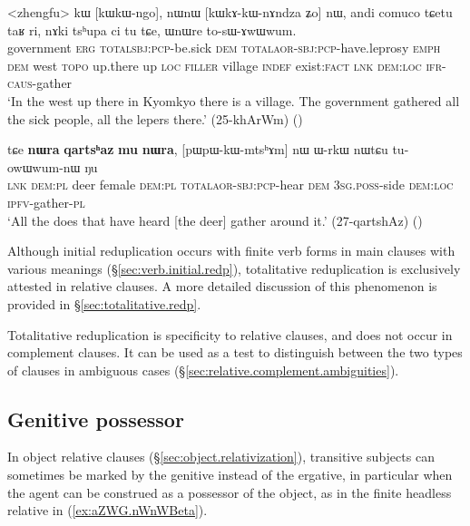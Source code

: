\begin{exe}
\ex \label{ex:kWkWngo.kWkAkWnAndza}
\gll <zhengfu> kɯ [kɯ\redp{}kɯ-ngo], nɯnɯ [kɯ\redp{}kɤ-kɯ-nɤndza ʑo] nɯ, andi comuco tɕetu taʁ ri, nɤki tsʰupa ci tu tɕe, ɯnɯre to-sɯ-ɤwɯwum. \\
government \textsc{erg} \textsc{total}\redp{}\textsc{sbj}:\textsc{pcp}-be.sick \textsc{dem} \textsc{total}\redp{}\textsc{aor}-\textsc{sbj}:\textsc{pcp}-have.leprosy \textsc{emph} \textsc{dem} west  \textsc{topo} up.there up \textsc{loc} \textsc{filler} village \textsc{indef} exist:\textsc{fact} \textsc{lnk} \textsc{dem}:\textsc{loc} \textsc{ifr}-\textsc{caus}-gather \\
\glt `In the west up there in Kyomkyo there is a village. The government gathered all the sick people, all the lepers there.' (25-khArWm)
()
\end{exe}

\begin{exe}
\ex \label{ex:qartshaz.pWpWkWmtshAm}
\gll  tɕe \textbf{nɯra} \textbf{qartsʰaz} \textbf{mu} \textbf{nɯra},  [pɯ\redp{}pɯ-kɯ-mtsʰɤm] nɯ ɯ-rkɯ nɯtɕu tu-owɯwum-nɯ ŋu \\
\textsc{lnk} \textsc{dem}:\textsc{pl} deer female \textsc{dem}:\textsc{pl} \textsc{total}\redp{}\textsc{aor}-\textsc{sbj}:\textsc{pcp}-hear \textsc{dem} \textsc{3sg}.\textsc{poss}-side \textsc{dem}:\textsc{loc} \textsc{ipfv}-gather-\textsc{pl} \\
\glt `All the does that have heard [the deer] gather around it.' (27-qartshAz)
()
\end{exe}


Although initial reduplication occurs with finite verb forms in main clauses with various meanings (§\ref{sec:verb.initial.redp}), totalitative reduplication is exclusively attested in relative clauses. A more detailed discussion of this phenomenon is provided in §\ref{sec:totalitative.redp}.

Totalitative reduplication is specificity to relative clauses, and does not occur in complement clauses. It can be used as a test to distinguish between the two types of clauses in ambiguous cases (§\ref{sec:relative.complement.ambiguities}).

 \subsection{Genitive possessor } \label{sec:relative.genitive.possessor.subject}
In object relative clauses (§\ref{sec:object.relativization}), transitive subjects can sometimes be marked by the genitive instead of the ergative, in particular when the agent can be construed as a possessor of the object, as in the finite headless relative in (\ref{ex:aZWG.nWnWBeta}).  

